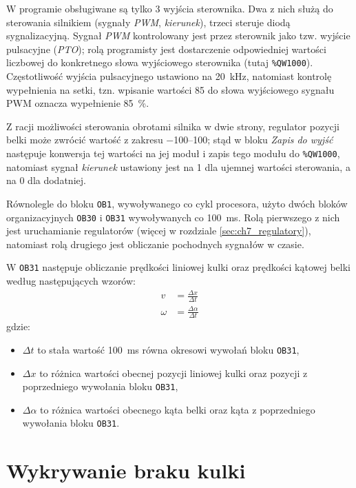 W programie obsługiwane są tylko \num{3} wyjścia sterownika. Dwa z nich służą do sterowania silnikiem (sygnały \textit{PWM}, \textit{kierunek}), trzeci steruje diodą sygnalizacyjną. Sygnał \textit{PWM} kontrolowany jest przez sterownik jako tzw. wyjście pulsacyjne (\textit{PTO}); rolą programisty jest dostarczenie odpowiedniej wartości liczbowej do konkretnego słowa wyjściowego sterownika (tutaj \texttt{\%QW1000}). Częstotliwość wyjścia pulsacyjnego ustawiono na \SI{20}{\kilo\hertz}, natomiast kontrolę wypełnienia na setki, tzn. wpisanie wartości \num{85} do słowa wyjściowego sygnału PWM oznacza wypełnienie \SI{85}{\percent}.

Z racji możliwości sterowania obrotami silnika w dwie strony, regulator pozycji belki może zwrócić wartość z zakresu \numrange[range-phrase={ do }]{-100}{100}; stąd w bloku \textit{Zapis do wyjść} następuje konwersja tej wartości na jej moduł i zapis tego modułu do \texttt{\%QW1000}, natomiast sygnał \textit{kierunek} ustawiony jest na \num{1} dla ujemnej wartości sterowania, a na \num{0} dla dodatniej.

Równolegle do bloku \texttt{OB1}, wywoływanego co cykl procesora, użyto dwóch bloków organizacyjnych \texttt{OB30} i \texttt{OB31} wywoływanych co \SI{100}{\milli\second}. Rolą pierwszego z nich jest uruchamianie regulatorów (więcej w rozdziale \ref{sec:ch7_regulatory}), natomiast rolą drugiego jest obliczanie pochodnych sygnałów w czasie.

W \texttt{OB31} następuje obliczanie prędkości liniowej kulki oraz prędkości kątowej belki według następujących wzorów:
\begin{align*}
    v &= \frac{\Delta x}{\Delta t} \\
    \omega &= \frac{\Delta \alpha}{\Delta t}
\end{align*}
gdzie:
\begin{itemize}
    \item $\Delta t$ to stała wartość \SI{100}{\milli\second} równa okresowi wywołań bloku \texttt{OB31},
    \item $\Delta x$ to różnica wartości obecnej pozycji liniowej kulki oraz pozycji z poprzedniego wywołania bloku \texttt{OB31},
    \item $\Delta \alpha$ to różnica wartości obecnego kąta belki oraz kąta z poprzedniego wywołania bloku \texttt{OB31}.
\end{itemize}

\section{Wykrywanie braku kulki}
\label{sec:ch7_wykrywanie_braku_kulki}

